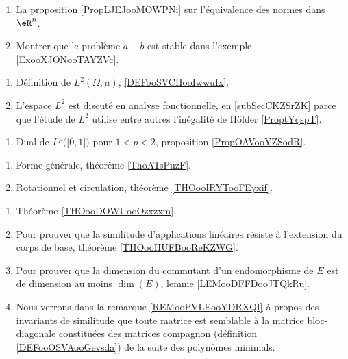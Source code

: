     \begin{enumerate}
\item
    La proposition \ref{PropLJEJooMOWPNi} sur l'équivalence des normes dans \( \eR^n\).
\item
    Montrer que le problème \( a-b\) est stable dans l'exemple \ref{ExooXJONooTAYZVc}.
\end{enumerate}

    \begin{enumerate}
        \item
            Définition de \( L^2(\Omega,\mu)\), \ref{DEFooSVCHooIwwuIx}.
        \item
            L'espace \( L^2\)  est discuté en analyse fonctionnelle, en \ref{subSecCKZSrZK} parce que l'étude de \( L^2\) utilise entre autres l'inégalité de Hölder \ref{ProptYqspT}.
\end{enumerate}

\begin{enumerate}
    \item
        Dual de \( L^p\big( \mathopen[ 0 , 1 \mathclose] \big)\) pour \( 1<p<2\), proposition \ref{PropOAVooYZSodR}.
\end{enumerate}

    \begin{enumerate}
        \item
            Forme générale, théorème \ref{ThoATsPuzF}.
        \item
            Rotationnel et circulation, théorème \ref{THOooIRYTooFEyxif}.
        \end{enumerate}

    \begin{enumerate}
        \item
            Théorème \ref{THOooDOWUooOzxzxm}.
        \item
            Pour prouver que la similitude d'applications linéaires résiste à l'extension du corps de base, théorème \ref{THOooHUFBooReKZWG}.
        \item
            Pour prouver que la dimension du commutant d'un endomorphisme de \( E\) est de dimension au moins \( \dim(E)\), lemme \ref{LEMooDFFDooJTQkRu}.
        \item
            Nous verrons dans la remarque \ref{REMooPVLEooYDRXQI} à propos des invariants de similitude que toute matrice est semblable à la matrice bloc-diagonale constituées des matrices compagnon (définition \ref{DEFooOSVAooGevsda}) de la suite des polynômes minimals.
        \end{enumerate}

